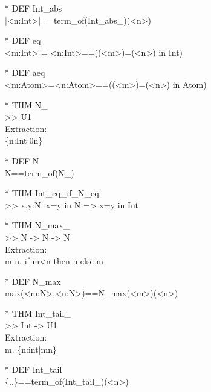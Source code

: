 \begin{prl*}
\>* DEF Int\_abs\\
\>  |<n:Int>|==term\_of(Int\_abs\_)(<n>)
\end{prl*}

\begin{prl*}
\>* DEF eq\\
\>  <m:Int> = <n:Int>==((<m>)=(<n>) in Int)
\end{prl*}

\begin{prl*}
\>* DEF aeq\\
\>  <m:Atom>=<n:Atom>==((<m>)=(<n>) in Atom)
\end{prl*}

\begin{prl*}
\>* THM N\_\\
\>  >> U1\\
\>  Extraction:\\
\>  \{n:Int|0\mleq{}n\}
\end{prl*}

\begin{prl*}
\>* DEF N\\
\>  N==term\_of(N\_)
\end{prl*}

\begin{prl*}
\>* THM Int\_eq\_if\_N\_eq\\
\>  >> \mforall{}x,y:N. x=y in N => x=y in Int
\end{prl*}

\begin{prl*}
\>* THM N\_max\_\\
\>  >> N -> N -> N\\
\>  Extraction:\\
\>  \mlambda{} m n. if m<n then n else m
\end{prl*}

\begin{prl*}
\>* DEF N\_max\\
\>  max(<m:N>,<n:N>)==N\_max(<m>)(<n>)
\end{prl*}

\begin{prl*}
\>* THM Int\_tail\_\\
\>  >> Int -> U1\\
\>  Extraction:\\
\>  \mlambda{}m.  \{n:int|m\mleq{}n\}
\end{prl*}

\begin{prl*}
\>* DEF Int\_tail\\
\>  \{<n:Int>..\}==term\_of(Int\_tail\_)(<n>)
\end{prl*}


